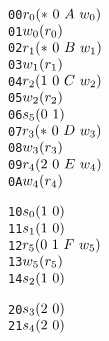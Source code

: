 \newsavebox{\boxTZero}
\begin{lrbox}{\boxTZero}
\begin{minipage}[t]{0.4\linewidth}
\large
\begin{alltt}
00 \(r\sb{0}(\ast\ 0\ A\ w\sb{0})\)
01 \(w\sb{0}(r\sb{0})\)
02 \(r\sb{1}(\ast\ 0\ B\ w\sb{1})\)
03 \(w\sb{1}(r\sb{1})\)
04 \(r\sb{2}(1\ 0\ C\ w\sb{2})\)
05 \(w\sb{2}(r\sb{2})\)
06 \(s\sb{5}(0\ 1)\)
07 \(r\sb{3}(\ast\ 0\ D\ w\sb{3})\)
08 \(w\sb{3}(r\sb{3})\)
09 \(r\sb{4}(2\ 0\ E\ w\sb{4})\)
0A \(w\sb{4}(r\sb{4})\)


\end{alltt}
\end{minipage}
\end{lrbox}

\newsavebox{\boxTOne}
\begin{lrbox}{\boxTOne}
\begin{minipage}[t]{0.4\linewidth}
\large
\begin{alltt}
10 \(s\sb{0}(1\ 0)\)
11 \(s\sb{1}(1\ 0)\)
12 \(r\sb{5}(0\ 1\ F\ w\sb{5})\)
13 \(w\sb{5}(r\sb{5})\)
14 \(s\sb{2}(1\ 0)\)
\end{alltt}
\end{minipage}
\end{lrbox}

\newsavebox{\boxTTwo}
\begin{lrbox}{\boxTTwo}
\begin{minipage}[t]{0.4\linewidth}
\large
\begin{alltt}
20 \(s\sb{3}(2\ 0)\)
21 \(s\sb{4}(2\ 0)\)\end{alltt}
\end{minipage}
\end{lrbox}


\newcommand\examplefigone{
\begin{figure*}[tb]
\begin{center}
\setlength{\tabcolsep}{2pt}
\begin{tabular}[t]{c|c|c}
$\mathit{p_1}$ & $\mathit{p_2}$ & $\mathit{p_3}$ \\
\hline
\scalebox{0.8}{\usebox{\boxTZero}}&
\scalebox{0.8}{\usebox{\boxTOne}} &
\scalebox{0.8}{\usebox{\boxTTwo}}\\
\end{tabular}
\end{center}
\caption{A simple concurrent trace program.}
\label{fig:example}
\end{figure*}
}
